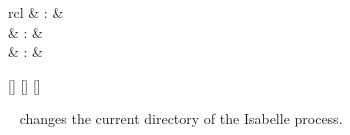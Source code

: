 \begin{isabellebody}
\begin{isamarkuptext}
\begin{description}
  \end{description}%
\end{isamarkuptext}%
\isamarkuptrue%
%
\isamarkuptrue%
%
\begin{isamarkuptext}%
\begin{matharray}{rcl}
    \hypertarget{command.cd}{\hyperlink{command.cd}{\mbox{}}} & : &  \\
    \hypertarget{command.pwd}{\hyperlink{command.pwd}{\mbox{}}} & : &  \\
    \hypertarget{command.use-thy}{\hyperlink{command.use-thy}{\mbox{}}} & : &  \\
  \end{matharray}

  \begin{railoutput}
\rail@bar
{}[]
[]
\rail@endbar
{}[]
\rail@end
\end{railoutput}


  \begin{description}

  \item \hyperlink{command.cd}{\mbox{}}~ changes the current directory
  of the Isabelle process.


\end{description}
\end{isamarkuptext}
\end{isabellebody}
